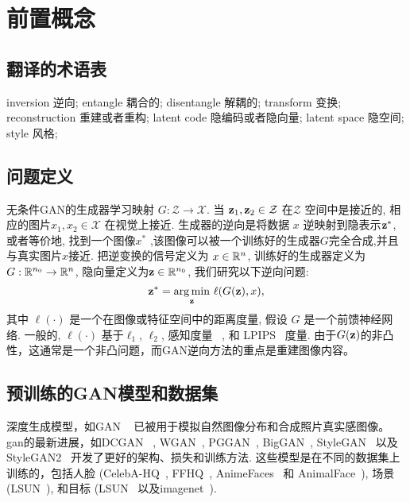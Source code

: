\section{前置概念}
\label{sec:overview}

\subsection{翻译的术语表}
\label{sec:term}
inversion 逆向;
entangle 耦合的;
disentangle 解耦的;
transform 变换;
reconstruction 重建或者重构;
latent code 隐编码或者隐向量;
latent space 隐空间;
style 风格;

\subsection{问题定义}
\label{sec:definition}
无条件GAN的生成器学习映射 $G: \mathcal{Z} \to \mathcal{X}$. 
当 $\mathbf{z}_1, \mathbf{z}_2 \in \mathcal{Z}$ 在$\mathcal{Z}$ 空间中是接近的, 相应的图片$x_1, x_2 \in \mathcal{X}$ 在视觉上接近. 
生成器的逆向是将数据 $x$ 逆映射到隐表示$\mathbf{z}^*$, 或者等价地, 找到一个图像${x^*}$ ,该图像可以被一个训练好的生成器$G$完全合成,并且与真实图片$x$接近.
把逆变换的信号定义为 $x \in \mathbb{R}^{n}$, 训练好的生成器定义为$G: \mathbb{R}^{n_{0}} \to \mathbb{R}^{n}$, 隐向量定义为$\mathbf{z} \in \mathbb{R}^{n_{0}}$, 我们研究以下逆向问题:
\begin{equation}
\z^*=\underset{\z}{\arg \min } \ \ell(G(\z), x),
\label{eqn:def}
\end{equation}
其中 $\ell(\cdot)$ 是一个在图像或特征空间中的距离度量, 假设 $G$ 是一个前馈神经网络. 
一般的, $\ell(\cdot)$ 基于$\ell_1$, $\ell_2$, 感知度量 ~\cite{johnson2016perceptual}, 和 LPIPS~\cite{zhang2018unreasonable} 度量.
由于$G(\mathbf{z})$的非凸性，这通常是一个非凸问题，而GAN逆向方法的重点是重建图像内容。

\subsection{预训练的GAN模型和数据集}
\label{sec:model_data}
深度生成模型，如GAN ~\cite{goodfellow2014generative} 已被用于模拟自然图像分布和合成照片真实感图像。 gan的最新进展，如DCGAN ~\cite{radford2016dcgan}, WGAN~\cite{gulrajani2017improved}, PGGAN~\cite{karras2017progressive}, BigGAN~\cite{brock2018large}, StyleGAN~\cite{karras2019style} 以及 StyleGAN2~\cite{karras2020analyzing} 开发了更好的架构、损失和训练方法. 这些模型是在不同的数据集上训练的，包括人脸 (CelebA-HQ~\cite{karras2017progressive}, FFHQ~\cite{karras2019style,karras2020analyzing}, AnimeFaces~\cite{jin2017towards} 和 AnimalFace~\cite{liu2019funit}), 场景 (LSUN~\cite{yu2015lsun}), 和目标 (LSUN~\cite{yu2015lsun} 以及imagenet~\cite{russakovsky2015imagenet}).

